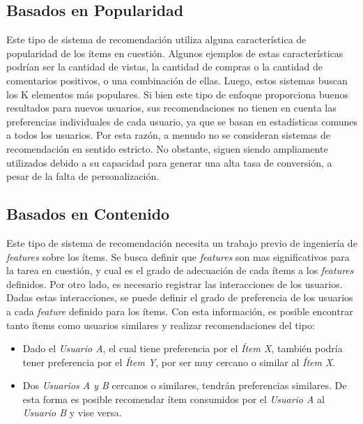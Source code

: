\documentclass[11pt,a4paper,twoside]{thesis}
\begin{document}
\subsection{Basados en Popularidad}

Este tipo de sistema de recomendación utiliza alguna característica de
popularidad de los ítems en cuestión. Algunos ejemplos de estas características
podrían ser la cantidad de vistas, la cantidad de compras o la cantidad de
comentarios positivos, o una combinación de ellas. Luego, estos sistemas buscan
los K elementos más populares. Si bien este tipo de enfoque proporciona buenos
resultados para nuevos usuarios, sus recomendaciones no tienen en cuenta las
preferencias individuales de cada usuario, ya que se basan en estadísticas
comunes a todos los usuarios. Por esta razón, a menudo no se consideran
sistemas de recomendación en sentido estricto. No obstante, siguen siendo
ampliamente utilizados debido a su capacidad para generar una alta tasa de
conversión, a pesar de la falta de personalización.

\subsection{Basados en Contenido}

Este tipo de sistema de recomendación necesita un trabajo previo de ingeniería
de \textit{features} sobre los ítems. Se busca definir que \textit{features}
son mas significativos para la tarea en cuestión, y cual es el grado de
adecuación de cada ítems a los \textit{features} definidos. Por otro lado, es
necesario registrar las interacciones de los usuarios. Dadas estas
interacciones, se puede definir el grado de preferencia de los usuarios a cada
\textit{feature} definido para los ítems. Con esta información, es posible
encontrar tanto ítems como usuarios similares y realizar recomendaciones del
tipo:

\begin{itemize}
	\item Dado el \textit{Usuario A}, el cual tiene preferencia por el \textit{Ítem X},
	      también podría tener preferencia por el \textit{Ítem Y}, por ser muy cercano o
	      similar al \textit{Ítem X}.
	\item Dos \textit{Usuarios A y B} cercanos o similares, tendrán preferencias
	      similares. De esta forma es posible recomendar ítem consumidos por el
	      \textit{Usuario A} al \textit{Usuario B} y vise versa.
\end{itemize}
\end{document}
